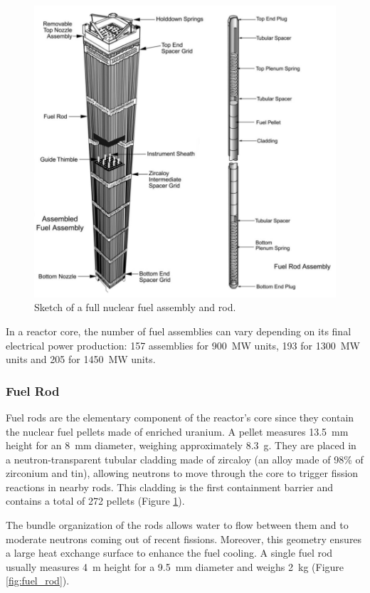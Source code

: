 \begin{figure}[!h]
\centering
\includegraphics[width=0.7\linewidth]{img/intro/fuel_assembly.png}
\caption{Sketch of a full nuclear fuel assembly and rod. \cite{croff_introduction_2008}}
\label{fig:fuel_assembly}
\end{figure}

\npar

In a reactor core, the number of fuel assemblies can vary depending on its final electrical power production: 157 assemblies for 900\ MW units, 193 for 1300~MW units and 205 for 1450~MW units.

\subsubsection{Fuel Rod}

Fuel rods are the elementary component of the reactor's core since they contain the nuclear fuel pellets made of enriched uranium. A pellet measures 13.5\ mm height for an 8\ mm diameter, weighing approximately 8.3\ g. They are placed in a neutron-transparent tubular cladding made of zircaloy (an alloy made of 98\% of zirconium and tin), allowing neutrons to move through the core to trigger fission reactions in nearby rods. This cladding is the first containment barrier and contains a total of 272 pellets (Figure \ref{fig:fuel_assembly}).

\npar

The bundle organization of the rods allows water to flow between them and to moderate neutrons coming out of recent fissions. Moreover, this geometry ensures a large heat exchange surface to enhance the fuel cooling. A single fuel rod usually measures 4\ m height for a 9.5\ mm diameter and weighs 2\ kg (Figure \ref{fig:fuel_rod}).


